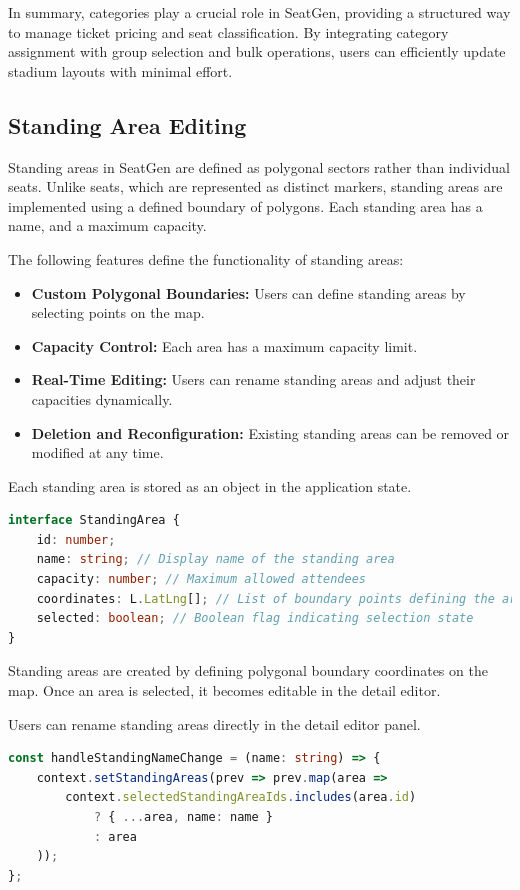 In summary, categories play a crucial role in SeatGen, providing a structured way to manage ticket pricing and seat classification. By integrating category assignment with group selection and bulk operations, users can efficiently update stadium layouts with minimal effort.

\subsection{Standing Area Editing}
Standing areas in SeatGen are defined as polygonal sectors rather than individual seats. Unlike seats, which are represented as distinct markers, standing areas are implemented using a defined boundary of polygons. Each standing area has a name, and a maximum capacity.

The following features define the functionality of standing areas:
\begin{itemize}
    \item \textbf{Custom Polygonal Boundaries:} Users can define standing areas by selecting points on the map.
    \item \textbf{Capacity Control:} Each area has a maximum capacity limit.
    \item \textbf{Real-Time Editing:} Users can rename standing areas and adjust their capacities dynamically.
    \item \textbf{Deletion and Reconfiguration:} Existing standing areas can be removed or modified at any time.
\end{itemize}

Each standing area is stored as an object in the application state.

\begin{lstlisting}[language=TypeScript, caption=Standing Area Data Model, label=lst:standingarea-model]
interface StandingArea {
    id: number;
    name: string; // Display name of the standing area
    capacity: number; // Maximum allowed attendees
    coordinates: L.LatLng[]; // List of boundary points defining the area
    selected: boolean; // Boolean flag indicating selection state
}
\end{lstlisting}

Standing areas are created by defining polygonal boundary coordinates on the map. Once an area is selected, it becomes editable in the detail editor.

Users can rename standing areas directly in the detail editor panel.

\begin{lstlisting}[language=TypeScript, caption=Renaming Standing Areas, label=lst:rename-standingarea]
const handleStandingNameChange = (name: string) => {
    context.setStandingAreas(prev => prev.map(area =>
        context.selectedStandingAreaIds.includes(area.id)
            ? { ...area, name: name }
            : area
    ));
};
\end{lstlisting}

